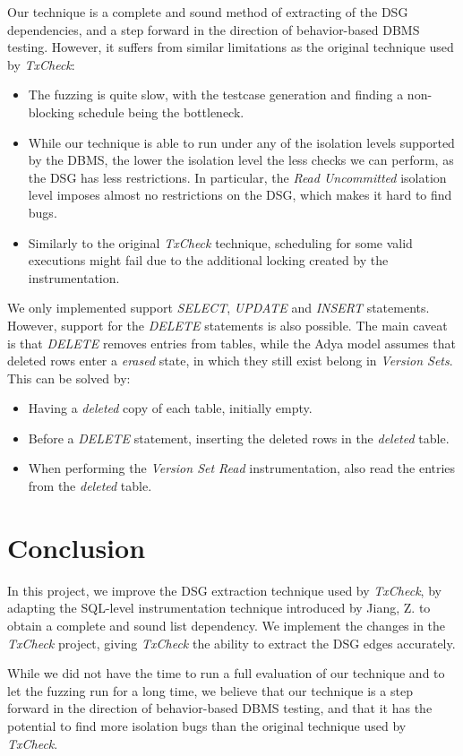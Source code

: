 Our technique is a complete and sound method of extracting of the DSG dependencies, and a step forward in the direction of behavior-based DBMS testing. However, it suffers from similar limitations as the original technique used by \textit{TxCheck}:
\begin{itemize}
    \item The fuzzing is quite slow, with the testcase generation and finding a non-blocking schedule being the bottleneck.
    \item While our technique is able to run under any of the isolation levels supported by the DBMS, the lower the isolation level the less checks we can perform, as the DSG has less restrictions. In particular, the \textit{Read Uncommitted} isolation level imposes almost no restrictions on the DSG, which makes it hard to find bugs.
    \item Similarly to the original \textit{TxCheck} technique, scheduling for some valid executions might fail due to the additional locking created by the instrumentation.
\end{itemize}

We only implemented support \textit{SELECT}, \textit{UPDATE} and \textit{INSERT} statements. However, support for the \textit{DELETE} statements is also possible. The main caveat is that \textit{DELETE} removes entries from tables, while the Adya model assumes that deleted rows enter a \textit{erased} state, in which they still exist belong in \textit{Version Sets}. This can be solved by:
\begin{itemize}
    \item Having a \textit{deleted} copy of each table, initially empty.
    \item Before a \textit{DELETE} statement, inserting the deleted rows in the \textit{deleted} table.
    \item When performing the \textit{Version Set Read} instrumentation, also read the entries from the \textit{deleted} table.
\end{itemize}

\section{Conclusion}

In this project, we improve the DSG extraction technique used by \textit{TxCheck}, by adapting the SQL-level instrumentation technique introduced by Jiang, Z. \cite{jiang2023detecting} to obtain a complete and sound list dependency. We implement the changes in the \textit{TxCheck} project, giving \textit{TxCheck} the ability to extract the DSG edges accurately.

While we did not have the time to run a full evaluation of our technique and to let the fuzzing run for a long time, we believe that our technique is a step forward in the direction of behavior-based DBMS testing, and that it has the potential to find more isolation bugs than the original technique used by \textit{TxCheck}.